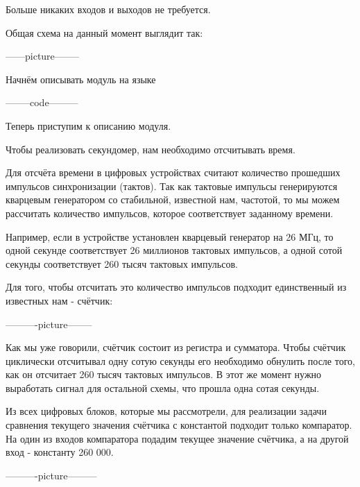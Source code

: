 \par{Больше никаких входов и выходов не требуется.}
\par{Общая схема на данный момент выглядит так:}

\par{------picture--------}

\par{Начнём описывать модуль на языке }

\par{--------code---------}

\par{Теперь приступим к описанию  модуля.}

\par{Чтобы реализовать секундомер, нам необходимо отсчитывать время.}

\par{Для отсчёта времени в цифровых устройствах считают количество прошедших импульсов синхронизации (тактов). Так как тактовые импульсы генерируются кварцевым генератором со стабильной, известной нам, частотой, то мы можем рассчитать количество импульсов, которое соответствует заданному времени.}

\par{Например, если в устройстве установлен кварцевый генератор на 26 МГц, то одной секунде соответствует 26 миллионов тактовых импульсов, а одной сотой секунды соответствует 260 тысяч тактовых импульсов.}

\par{Для того, чтобы отсчитать это количество импульсов подходит единственный из известных нам  - счётчик:}

\par{----------picture--------}

\par{Как мы уже говорили, счётчик состоит из регистра и сумматора. Чтобы счётчик циклически отсчитывал одну сотую секунды его необходимо обнулить после того, как он отсчитает 260 тысяч тактовых импульсов. В этот же момент нужно выработать сигнал для остальной схемы, что прошла одна сотая секунды.}

\par{Из всех цифровых блоков, которые мы рассмотрели, для реализации задачи сравнения текущего значения счётчика с константой подходит только компаратор. На один из входов компаратора подадим текущее значение счётчика, а на другой вход - константу 260 000.}

\par{----------picture---------}

